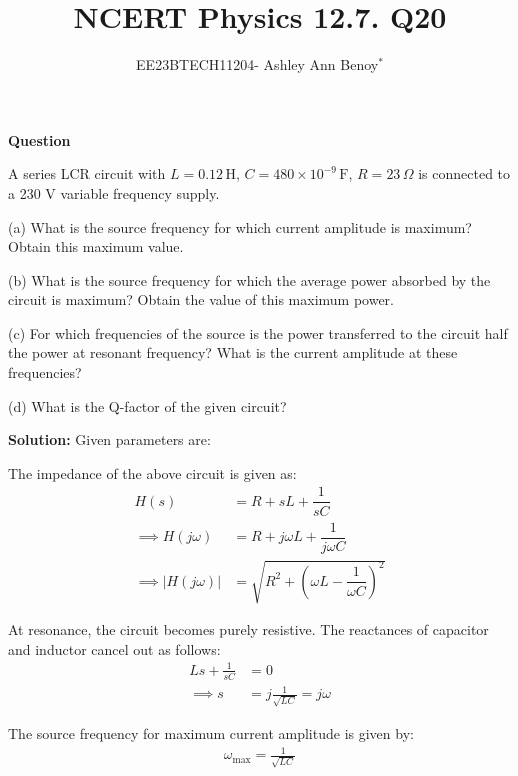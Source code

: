 \documentclass[journal,12pt,twocolumn]{IEEEtran}
\theoremstyle{remark}
\begin{document}

\vspace{3cm}

\title{NCERT Physics 12.7. Q20}
\author{EE23BTECH11204- Ashley Ann Benoy$^{*}$%
}
\maketitle
\newpage
\bigskip

\renewcommand{\thefigure}{\theenumi}
\renewcommand{\thetable}{\theenumi}



\textbf{Question}

A series LCR circuit with 
\(L = 0.12 \, \text{H}\),
\(C = 480 \times 10^{-9} \, \text{F}\), 
\(R=23 \, \Omega\)
is connected to a 230 V variable frequency supply.

(a) What is the source frequency for which current amplitude is maximum? Obtain this maximum value.

(b) What is the source frequency for which the average power absorbed by the circuit is maximum? Obtain the value of this maximum power.

(c) For which frequencies of the source is the power transferred to the circuit half the power at resonant frequency? What is the current amplitude at these frequencies?

(d) What is the Q-factor of the given circuit?

\textbf{Solution:}
Given parameters are:




The impedance of the above circuit is given as:
\begin{align}
     H(s) &= R + sL + \dfrac{1}{sC}\\
     \implies H(j\omega) &= R + j\omega L + \dfrac{1}{j\omega C}\\
     \implies \lvert H(j\omega) \rvert &= \sqrt{R^2 + \left(\omega L - \dfrac{1}{\omega C}\right)^2}
\end{align}

 At resonance, the circuit becomes purely resistive. The reactances of capacitor and inductor cancel out as follows:
\begin{align}
    Ls + \frac{1}{sC} &= 0 \\
    \implies s &= j\frac{1}{\sqrt{LC}} = j\omega
\end{align}

The source frequency for maximum current amplitude is given by:
\begin{align}
    \omega_{\text{max}} = \frac{1}{\sqrt{LC}}
    \label{eq:omega_max}
\end{align}
\end{document}
